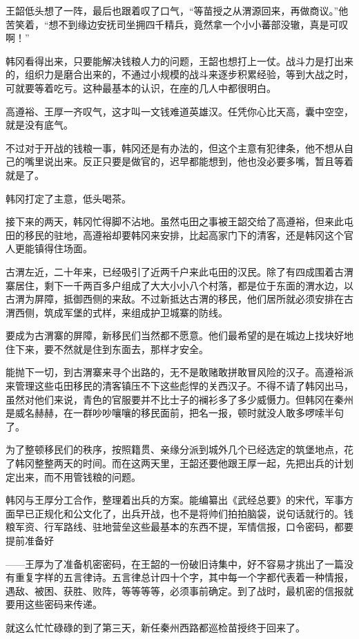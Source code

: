 王韶低头想了一阵，最后也跟着叹了口气，“等苗授之从渭源回来，再做商议。”他苦笑着，“想不到缘边安抚司坐拥四千精兵，竟然拿一个小小蕃部没辙，真是可叹啊！”

韩冈看得出来，只要能解决钱粮人力的问题，王韶也想打上一仗。战斗力是打出来的，组织力是磨合出来的，不通过小规模的战斗来逐步积累经验，等到大战之时，可就要等着吃亏。这种最基本的认识，在座的几人中都很明白。

高遵裕、王厚一齐叹气，这才叫一文钱难道英雄汉。任凭你心比天高，囊中空空，就是没有底气。

不过对于开战的钱粮一事，韩冈还是有办法的，但这个主意有犯律条，他不想从自己的嘴里说出来。反正只要是做官的，迟早都能想到，他也没必要多嘴，暂且等着就是了。

韩冈打定了主意，低头喝茶。

接下来的两天，韩冈忙得脚不沾地。虽然屯田之事被王韶交给了高遵裕，但来此屯田的移民的驻地，高遵裕却要韩冈来安排，比起高家门下的清客，还是韩冈这个官人更能镇得住场面。

古渭左近，二十年来，已经吸引了近两千户来此屯田的汉民。除了有四成围着古渭寨居住，剩下一千两百多户组成了大大小小八个村落，都是位于东面的渭水边，以古渭为屏障，抵御西侧的来敌。不过新抵达古渭的移民，他们居所就必须安排在古渭西侧，筑成军堡的式样，来组成护卫城寨的防线。

要成为古渭寨的屏障，新移民们当然都不愿意。他们最希望的是在城边上找块好地住下来，要不然就是住到东面去，那样才安全。

能抛下一切，到古渭寨来寻个出路的，无不是敢赌敢拼敢冒风险的汉子。高遵裕派来管理这些屯田移民的清客镇压不下这些彪悍的关西汉子。不得不请了韩冈出马，虽然对他们来说，青色的官服要并不比士子的襕衫多了多少威慑力。但韩冈在秦州是威名赫赫，在一群吵吵嚷嚷的移民面前，把名一报，顿时就没人敢多啰嗦半句了。

为了整顿移民们的秩序，按照籍贯、亲缘分派到城外几个已经选定的筑堡地点，花了韩冈整整两天的时间。而在这两天里，王韶还要他跟王厚一起，先把出兵的计划定出来，而不用管钱粮的问题。

韩冈与王厚分工合作，整理着出兵的方案。能编纂出《武经总要》的宋代，军事方面早已正规化和公文化了，出兵开战，也不是将帅们拍拍脑袋，说句话就行的。钱粮军资、行军路线、驻地营垒这些最基本的东西不提，军情信报，口令密码，都要提前准备好

——王厚为了准备机密密码，在王韶的一份破旧诗集中，好不容易才挑出了一篇没有重复字样的五言律诗。五言律总计四十个字，其中每一个字都代表着一种情报，遇敌、被困、获胜、败阵，等等等等，必须事前确定。到了战时，最机密的信报就要用这些密码来传递。

就这么忙忙碌碌的到了第三天，新任秦州西路都巡检苗授终于回来了。

